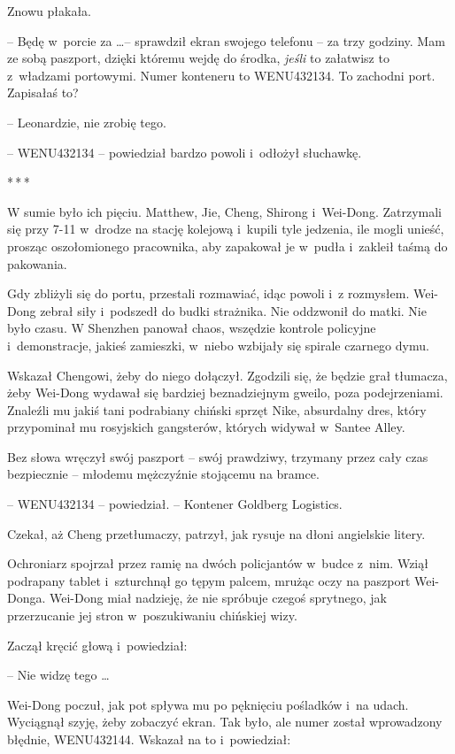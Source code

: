 \documentclass[oneside,polish,11pt,rmheadings]{mwbk}
\newcommand{\threeast}{\par\centerline{*\,*\,*}\medskip\par}
\begin{document}
Znowu płakała.

-- Będę w~porcie za  \ldots  -- sprawdził ekran swojego telefonu -- za trzy godziny. Mam ze sobą paszport, dzięki któremu wejdę do środka, \textit{jeśli }to załatwisz to z~władzami portowymi. Numer konteneru to WENU432134. To zachodni port. Zapisałaś to?

-- Leonardzie, nie zrobię tego.

-- WENU432134 -- powiedział bardzo powoli i~odłożył słuchawkę.

\bigskip
\threeast

W sumie było ich pięciu. Matthew, Jie, Cheng, Shirong i~Wei-Dong. Zatrzymali się przy 7-11 w~drodze na stację kolejową i~kupili tyle jedzenia, ile mogli unieść, prosząc oszołomionego pracownika, aby zapakował je w~pudła i~zakleił taśmą do pakowania.

Gdy zbliżyli się do portu, przestali rozmawiać, idąc powoli i~z rozmysłem. Wei-Dong zebrał siły i~podszedł do budki strażnika. Nie oddzwonił do matki. Nie było czasu. W Shenzhen panował chaos, wszędzie kontrole policyjne i~demonstracje, jakieś zamieszki, w~niebo wzbijały się spirale czarnego dymu.

Wskazał Chengowi, żeby do niego dołączył. Zgodzili się, że będzie grał tłumacza, żeby Wei-Dong wydawał się bardziej beznadziejnym gweilo, poza podejrzeniami. Znaleźli mu jakiś tani podrabiany chiński sprzęt Nike, absurdalny dres, który przypominał mu rosyjskich gangsterów, których widywał w~Santee Alley.

Bez słowa wręczył swój paszport -- swój prawdziwy, trzymany przez cały czas bezpiecznie -- młodemu mężczyźnie stojącemu na bramce. 

-- WENU432134 -- powiedział. -- Kontener Goldberg Logistics.

Czekał, aż Cheng przetłumaczy, patrzył, jak rysuje na dłoni angielskie litery.

Ochroniarz spojrzał przez ramię na dwóch policjantów w~budce z~nim. Wziął podrapany tablet i~szturchnął go tępym palcem, mrużąc oczy na paszport Wei-Donga. Wei-Dong miał nadzieję, że nie spróbuje czegoś sprytnego, jak przerzucanie jej stron w~poszukiwaniu chińskiej wizy.

Zaczął kręcić głową i~powiedział: 

-- Nie widzę tego \ldots 

Wei-Dong poczuł, jak pot spływa mu po pęknięciu pośladków i~na udach. Wyciągnął szyję, żeby zobaczyć ekran. Tak było, ale numer został wprowadzony błędnie, WENU432144. Wskazał na to i~powiedział: 
\end{document}

